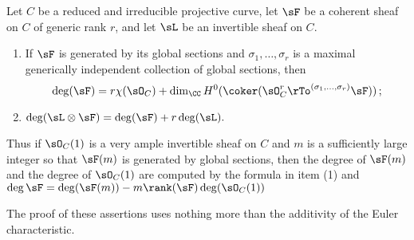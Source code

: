 \begin{fact} Let $C$ be a reduced and irreducible projective curve, let $\sF$ be a coherent sheaf on $C$ of generic rank $r$, and let $\sL$ be an invertible sheaf on $C$.
\begin{enumerate}
\item If $\sF$ is generated by its global sections and $\sigma_1,\dots, \sigma_r$ is a maximal generically independent
collection of global sections,  then 
$$
\deg (\sF) = r \chi(\sO_C)+
\dim_\CC H^0(\coker(\sO_C^r \rTo^{(\sigma_1,\dots, \sigma_r)}\sF))\,;
$$

\item $\deg (\sL \otimes \sF) = \deg (\sF) +r\deg (\sL).$

\end{enumerate}
Thus if $\sO_C(1)$ is a very ample invertible sheaf on $C$ and $m$ is a sufficiently large integer so that
$\sF(m)$ is generated by global sections, then the degree of $\sF(m)$ and the degree of $\sO_C(1)$ are computed by the formula in item (1)
and $\deg \sF = \deg(\sF(m)) - m \rank(\sF) \deg (\sO_C(1))$

The proof of these assertions uses nothing more than the additivity of the Euler characteristic.
\end{fact}
%
%
%

